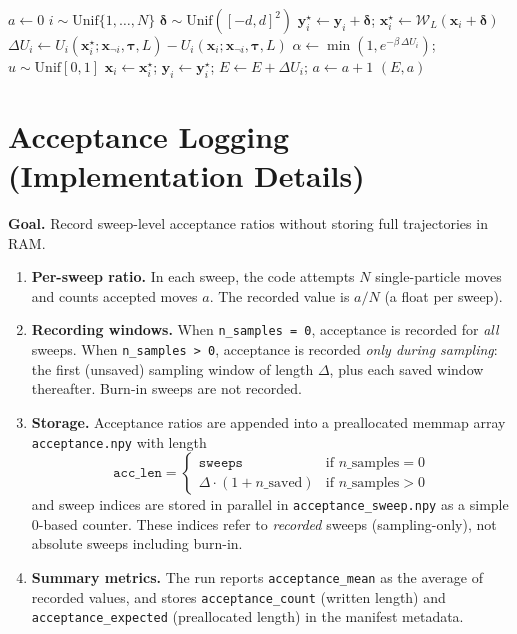 \documentclass[11pt]{article}
\begin{document}
\begin{algorithm}[t]
\begin{algorithmic}[1]
  \State $a\gets 0$
   
    \State $i\sim \mathrm{Unif}\{1,\dots,N\}$
    \State $\boldsymbol{\delta}\sim \mathrm{Unif}([-d,d]^2)$
    \State $\mathbf{y}_i^\star \gets \mathbf{y}_i+\boldsymbol{\delta}$; $\mathbf{x}_i^\star \gets \mathcal{W}_L(\mathbf{x}_i+\boldsymbol{\delta})$
    \State $\Delta U_i \gets U_i(\mathbf{x}_i^\star;\mathbf{x}_{\neg i},\boldsymbol{\tau},L)-U_i(\mathbf{x}_i;\mathbf{x}_{\neg i},\boldsymbol{\tau},L)$
    \State $\alpha \gets \min\!\left(1,e^{-\beta\,\Delta U_i}\right)$; $u\sim \mathrm{Unif}[0,1]$
      \State $\mathbf{x}_i\gets \mathbf{x}_i^\star$; $\mathbf{y}_i\gets \mathbf{y}_i^\star$; $E\gets E+\Delta U_i$; $a\gets a+1$
    \EndIf
  \EndFor
  \State \Return $(E,a)$
\EndFunction
\end{algorithmic}
\end{algorithm}

\section*{Acceptance Logging (Implementation Details)}
\textbf{Goal.} Record sweep-level acceptance ratios without storing full trajectories in RAM.

\begin{enumerate}
  \item \textbf{Per-sweep ratio.} In each sweep, the code attempts \(N\) single-particle moves and counts accepted moves \(a\). The recorded value is \(a/N\) (a float per sweep).
  \item \textbf{Recording windows.} When \texttt{n\_samples = 0}, acceptance is recorded for \emph{all} sweeps. When \texttt{n\_samples > 0}, acceptance is recorded \emph{only during sampling}: the first (unsaved) sampling window of length \(\Delta\), plus each saved window thereafter. Burn-in sweeps are not recorded.
  \item \textbf{Storage.} Acceptance ratios are appended into a preallocated memmap array \texttt{acceptance.npy} with length
  \[
    \texttt{acc\_len} =
    \begin{cases}
      \texttt{sweeps} & \text{if } n\_\text{samples}=0 \\
      \Delta \cdot (1 + n\_\text{saved}) & \text{if } n\_\text{samples}>0
    \end{cases}
  \]
  and sweep indices are stored in parallel in \texttt{acceptance\_sweep.npy} as a simple 0-based counter. These indices refer to \emph{recorded} sweeps (sampling-only), not absolute sweeps including burn-in.
  \item \textbf{Summary metrics.} The run reports \texttt{acceptance\_mean} as the average of recorded values, and stores \texttt{acceptance\_count} (written length) and \texttt{acceptance\_expected} (preallocated length) in the manifest metadata.
\end{enumerate}
\end{document}
